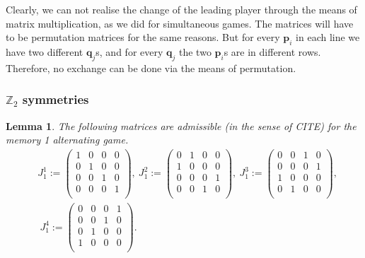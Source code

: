 \documentclass{article}
\def\p{\mathbf{p}}
\def\q{\mathbf{q}}
\newtheorem{lemma}[theorem]{Lemma}
\theoremstyle{definition}
\numberwithin{equation}{section}
\begin{document}
Clearly, we can not realise the change of the leading player through the means of matrix multiplication, as we did for simultaneous games. The matrices will have to be permutation matrices for the same reasons. But for every $\p_i$ in each line we have two different $\q_j$s, and for every $\q_j$ the two $\p_i$s are in different rows. Therefore, no exchange can be done via the means of permutation.






\subsubsection{$\mathbb{Z}_2$ symmetries}
\begin{lemma}
\label{st: matrices memory 1}
The following matrices are admissible (in the sense of CITE) for the memory 1 alternating game.  
\begin{equation}
        \label{eq: good J for memory 1}
        \begin{split}
 &  J^1_1 := \left(
\begin{array}{cccc}
 1 & 0 & 0 & 0 \\
 0 & 1 & 0 & 0 \\
 0 & 0 & 1 & 0 \\
 0 & 0 & 0 & 1 \\
\end{array}
\right), \ J^2_1:=\left(
\begin{array}{cccc}
 0 & 1 & 0 & 0 \\
 1 & 0 & 0 & 0 \\
 0 & 0 & 0 & 1 \\
 0 & 0 & 1 & 0 \\
\end{array}
\right), \ J^3_1:=\left(
\begin{array}{cccc}
 0 & 0 & 1 & 0 \\
 0 & 0 & 0 & 1 \\
 1 & 0 & 0 & 0 \\
 0 & 1 & 0 & 0 \\
\end{array}
\right), \\& \ J^4_1:=
\left(
\begin{array}{cccc}
 0 & 0 & 0 & 1 \\
 0 & 0 & 1 & 0 \\
 0 & 1 & 0 & 0 \\
 1 & 0 & 0 & 0 \\
\end{array}
\right).
        \end{split}
    \end{equation}
    \end{lemma}
\end{document}
